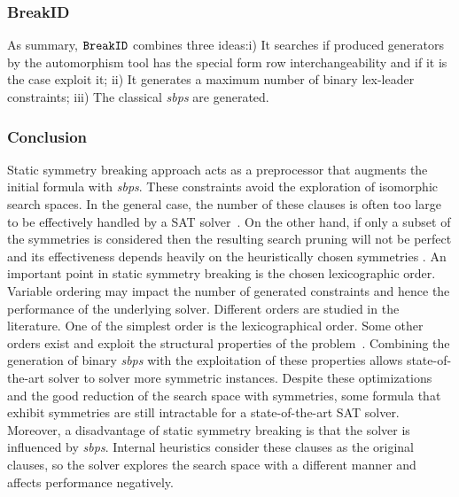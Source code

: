 \subsubsection{BreakID}
As summary, $\texttt{BreakID}$ combines three ideas:i) It searches if produced generators by the automorphism tool has the special form row interchangeability and if it is the case exploit it;
ii) It generates a maximum number of binary lex-leader constraints; iii) The classical \textit{sbps} are 
generated.

%

\subsubsection{Conclusion}
Static symmetry breaking approach acts as a preprocessor that augments the initial formula with
\textit{sbps}. These constraints avoid the exploration of isomorphic search spaces.
In the general case, the number of these clauses is often too large to be
effectively handled by a SAT solver~\cite{Luks2004}. 
On the other hand, if only a subset of the symmetries is considered then the resulting search pruning
will not be perfect and its effectiveness depends heavily on the
heuristically chosen symmetries \cite{biere2009handbook}.
An important point in static symmetry breaking is the chosen lexicographic order.
Variable ordering may impact the number of generated constraints and hence the performance of
the underlying solver. Different orders are studied in the literature. 
One of the simplest order is the  lexicographical order.
Some other orders exist and exploit the structural properties of the 
problem~\cite{devriendt2016improved}. Combining the generation of binary \textit{sbps} with the exploitation of
these properties allows state-of-the-art solver to solver more symmetric instances.
Despite these optimizations and the good reduction of the search space with symmetries,
some formula that exhibit symmetries are still intractable for a state-of-the-art SAT solver.
Moreover, a disadvantage of static symmetry breaking is that the solver is influenced by \textit{sbps}.
Internal heuristics consider these clauses as the original clauses, so the solver explores
the search space with a different manner and affects performance negatively.

